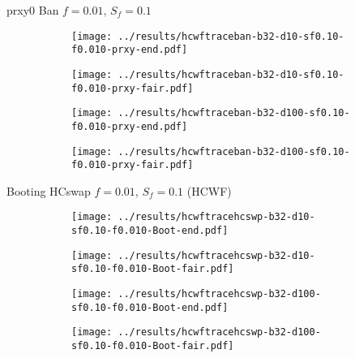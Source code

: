 \documentclass[8pt,a4paper]{beamer}
\begin{document}
\begin{frame}{prxy0 Ban $f=0.01,\, S_f=0.1$}
	\begin{figure}
		\begin{subfigure}{.48\textwidth}
			\centering
			\texttt{[image: ../results/hcwftraceban-b32-d10-sf0.10-f0.010-prxy-end.pdf]}
		\end{subfigure}
		\begin{subfigure}{.48\textwidth}
			\centering
			\texttt{[image: ../results/hcwftraceban-b32-d10-sf0.10-f0.010-prxy-fair.pdf]}
		\end{subfigure}
	\end{figure}
	
	\begin{figure}
		\begin{subfigure}{.48\textwidth}
			\centering
			\texttt{[image: ../results/hcwftraceban-b32-d100-sf0.10-f0.010-prxy-end.pdf]}
		\end{subfigure}
		\begin{subfigure}{.48\textwidth}
			\centering
			\texttt{[image: ../results/hcwftraceban-b32-d100-sf0.10-f0.010-prxy-fair.pdf]}
		\end{subfigure}
	\end{figure}
\end{frame}


\begin{frame}{Booting HCswap $f=0.01,\, S_f=0.1$ (HCWF)}
	\begin{figure}
		\begin{subfigure}{.48\textwidth}
			\centering
			\texttt{[image: ../results/hcwftracehcswp-b32-d10-sf0.10-f0.010-Boot-end.pdf]}
		\end{subfigure}
		\begin{subfigure}{.48\textwidth}
			\centering
			\texttt{[image: ../results/hcwftracehcswp-b32-d10-sf0.10-f0.010-Boot-fair.pdf]}
		\end{subfigure}
	\end{figure}

	\begin{figure}
		\begin{subfigure}{.48\textwidth}
			\centering
			\texttt{[image: ../results/hcwftracehcswp-b32-d100-sf0.10-f0.010-Boot-end.pdf]}
		\end{subfigure}
		\begin{subfigure}{.48\textwidth}
			\centering
			\texttt{[image: ../results/hcwftracehcswp-b32-d100-sf0.10-f0.010-Boot-fair.pdf]}
		\end{subfigure}
	\end{figure}
\end{frame}
\end{document}
